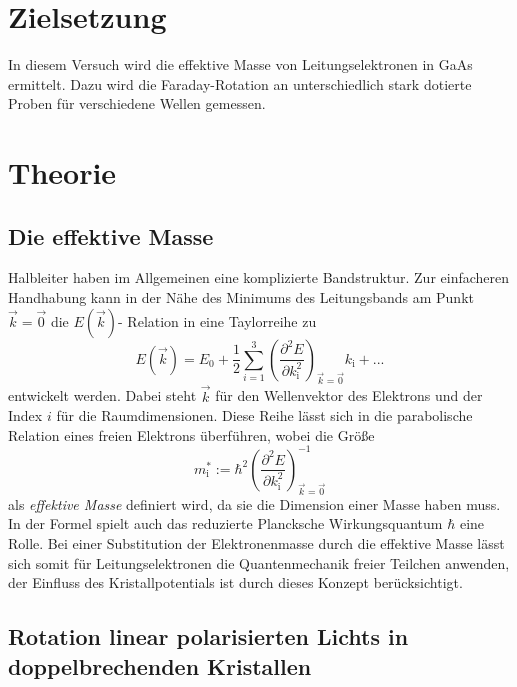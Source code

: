 \section{Zielsetzung}
\label{sec:Zielsetzung}

In diesem Versuch wird die effektive Masse von Leitungselektronen in
GaAs ermittelt.
Dazu wird die Faraday-Rotation an unterschiedlich stark
dotierte Proben für verschiedene Wellen gemessen.

\section{Theorie}
\label{sec:Theorie}

\subsection{Die effektive Masse}
\label{sec:effMasse}

Halbleiter haben im Allgemeinen eine komplizierte Bandstruktur.
Zur einfacheren Handhabung kann in der Nähe des Minimums des
Leitungsbands am Punkt $\vec{k} = \vec{0}$ die $E\left(\vec{k}\right)$-
Relation in eine Taylorreihe zu
\begin{equation*}
  E\left(\vec{k}\right) = E_\text{0} +
  \frac{1}{2} \sum_{i = 1}^3
  \left(\frac{\partial^2 E}{\partial k_\text{i}^2}\right)_{\vec{k} = \vec{0}}
  k_\text{i} + ...
\end{equation*}
entwickelt werden.
Dabei steht $\vec{k}$ für den Wellenvektor des Elektrons und der Index
$i$ für die Raumdimensionen.
Diese Reihe lässt sich in die parabolische Relation eines freien Elektrons
überführen, wobei die Größe
\begin{equation}
  m_\text{i}^* := \hbar^2
  \left(\frac{\partial^2 E}{\partial k_\text{i}^2}\right)_{\vec{k} = \vec{0}}^{-1}
  \label{eqn:effMasse}
\end{equation}
als \emph{effektive Masse} definiert wird,
da sie die Dimension einer Masse haben muss.
In der Formel spielt auch das reduzierte Plancksche
Wirkungsquantum $\hbar$ eine Rolle.
Bei einer Substitution der Elektronenmasse durch die effektive Masse lässt
sich somit für Leitungselektronen die Quantenmechanik freier Teilchen
anwenden, der Einfluss des Kristallpotentials ist durch dieses
Konzept berücksichtigt.

\subsection{Rotation linear polarisierten Lichts in doppelbrechenden Kristallen}
\label{sec:Theo1}

